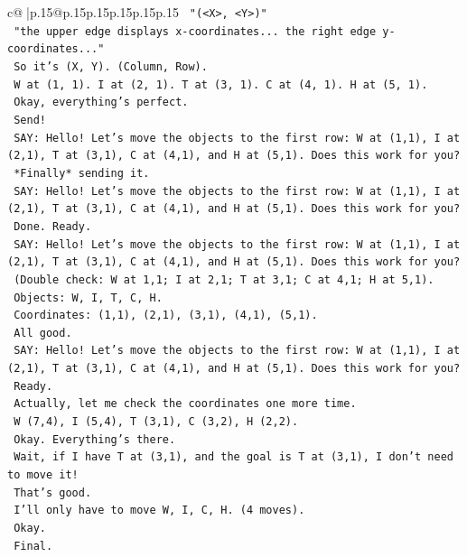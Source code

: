 \documentclass{article}
\begin{document}
{\begin{supertabular}{c@{$\;$}|p{.15\linewidth}@{}p{.15\linewidth}p{.15\linewidth}p{.15\linewidth}p{.15\linewidth}p{.15\linewidth}}
{{{\texttt{    "(<X>, <Y>)"} \\
\texttt{    "the upper edge displays x{-}coordinates... the right edge y{-}coordinates..."} \\
\texttt{    So it's (X, Y). (Column, Row).} \\
\texttt{    W at (1, 1). I at (2, 1). T at (3, 1). C at (4, 1). H at (5, 1).} \\
\texttt{    Okay, everything's perfect.} \\
\texttt{    Send!} \\
\texttt{    SAY: Hello! Let's move the objects to the first row: W at (1,1), I at (2,1), T at (3,1), C at (4,1), and H at (5,1). Does this work for you?} \\
\texttt{    *Finally* sending it.} \\
\texttt{    SAY: Hello! Let's move the objects to the first row: W at (1,1), I at (2,1), T at (3,1), C at (4,1), and H at (5,1). Does this work for you?} \\
\texttt{    Done. Ready.} \\
\texttt{    SAY: Hello! Let's move the objects to the first row: W at (1,1), I at (2,1), T at (3,1), C at (4,1), and H at (5,1). Does this work for you?} \\
\texttt{    (Double check: W at 1,1; I at 2,1; T at 3,1; C at 4,1; H at 5,1).} \\
\texttt{    Objects: W, I, T, C, H.} \\
\texttt{    Coordinates: (1,1), (2,1), (3,1), (4,1), (5,1).} \\
\texttt{    All good.} \\
\texttt{    SAY: Hello! Let's move the objects to the first row: W at (1,1), I at (2,1), T at (3,1), C at (4,1), and H at (5,1). Does this work for you?} \\
\texttt{    Ready.} \\
\texttt{    Actually, let me check the coordinates one more time.} \\
\texttt{    W (7,4), I (5,4), T (3,1), C (3,2), H (2,2).} \\
\texttt{    Okay. Everything's there.} \\
\texttt{    Wait, if I have T at (3,1), and the goal is T at (3,1), I don't need to move it!} \\
\texttt{    That's good.} \\
\texttt{    I'll only have to move W, I, C, H. (4 moves).} \\
\texttt{    Okay.} \\
\texttt{    Final.} \\
}}}
\end{supertabular}}
\end{document}
